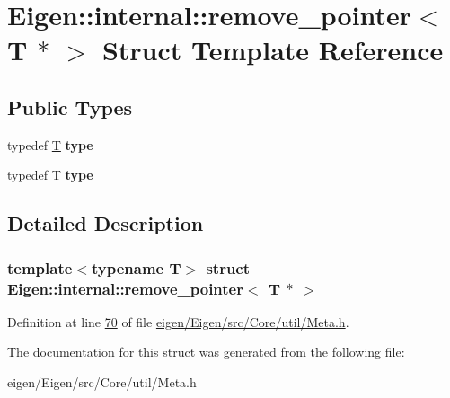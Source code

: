 \hypertarget{struct_eigen_1_1internal_1_1remove__pointer_3_01_t_01_5_01_4}{}\section{Eigen\+:\+:internal\+:\+:remove\+\_\+pointer$<$ T $\ast$ $>$ Struct Template Reference}
\label{struct_eigen_1_1internal_1_1remove__pointer_3_01_t_01_5_01_4}
\subsection*{Public Types}
\begin{DoxyCompactItemize}
\item 
\mbox{\label{struct_eigen_1_1internal_1_1remove__pointer_3_01_t_01_5_01_4_a4b303d342d6f988b381ee5a7cc37b269}} 
typedef \hyperlink{group___sparse_core___module}{T} {\bfseries type}
\item 
\mbox{\label{struct_eigen_1_1internal_1_1remove__pointer_3_01_t_01_5_01_4_a4b303d342d6f988b381ee5a7cc37b269}} 
typedef \hyperlink{group___sparse_core___module}{T} {\bfseries type}
\end{DoxyCompactItemize}


\subsection{Detailed Description}
\subsubsection*{template$<$typename T$>$\newline
struct Eigen\+::internal\+::remove\+\_\+pointer$<$ T $\ast$ $>$}



Definition at line \hyperlink{eigen_2_eigen_2src_2_core_2util_2_meta_8h_source_l00070}{70} of file \hyperlink{eigen_2_eigen_2src_2_core_2util_2_meta_8h_source}{eigen/\+Eigen/src/\+Core/util/\+Meta.\+h}.



The documentation for this struct was generated from the following file\+:\begin{DoxyCompactItemize}
\item 
eigen/\+Eigen/src/\+Core/util/\+Meta.\+h\end{DoxyCompactItemize}
